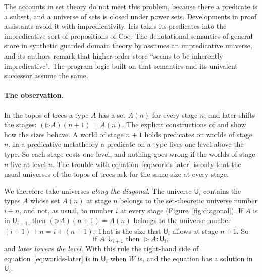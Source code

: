 \documentclass[acmsmall,nonacm,screen]{acmart}
\newcommand{\later}{{\triangleright}}
\newcommand{\Uv}{\mathsf{U}}
\newcommand{\Wld}{W}
\begin{document}
The accounts in set theory do not meet this problem, because there a predicate is a subset,
and a universe of sets is closed under power sets. Developments in
proof assistants avoid it with impredicativity. Iris \citep{Iris2018} takes its predicates
into the impredicative sort of propositions of Coq. The denotational semantics of general
store in synthetic guarded domain theory by \citet{SGB2022} assumes an impredicative
universe, and its authors remark that higher-order store ``seems to be inherently
impredicative''. The program logic built on that semantics \citep{Tulip2023} and its
univalent successor \citep{SGB2024} assume the same.

\paragraph{The observation.}
In the topos of trees a type $A$ has a set $A(n)$ for every stage $n$, and later shifts the
stages: $(\later A)(n+1) = A(n)$. The explicit constructions of
\citet{AppelMcAllester2001} and \citet{Ahmed2004} show how the sizes behave. A world of stage
$n+1$ holds predicates on worlds of stage $n$. In a predicative metatheory a predicate on a
type lives one level above the type. So each stage costs one level, and nothing goes wrong
if the worlds of stage $n$ live at level $n$. The trouble with
equation~\eqref{eq:worlds-later} is only that the usual universes of the topos of trees ask
for the same size at every stage.

We therefore take universes \emph{along the diagonal}. The universe $\Uv_i$ contains the types
$A$ whose set $A(n)$ at stage $n$ belongs to the set-theoretic universe number $i+n$, and
not, as usual, to number $i$ at every stage (Figure~\ref{fig:diagonal}). If $A$ is in
$\Uv_{i+1}$, then $(\later A)(n+1) = A(n)$ belongs to the universe number $(i+1)+n = i+(n+1)$.
That is the size that $\Uv_i$ allows at stage $n+1$. So
\[
  \text{if } A : \Uv_{i+1} \text{ then } \later A : \Uv_i ,
\]
and \emph{later lowers the level}. With this rule the right-hand side of
equation~\eqref{eq:worlds-later} is in $\Uv_i$ when $\Wld$ is, and the equation has a
solution in $\Uv_i$.
\end{document}
